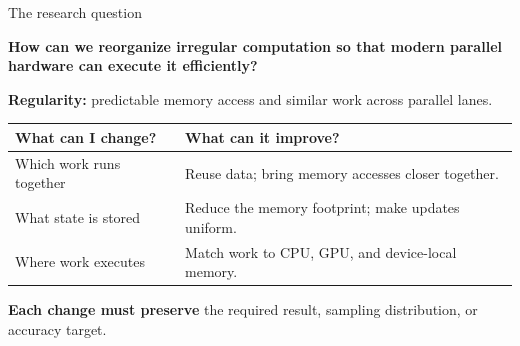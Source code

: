 \documentclass[10pt,aspectratio=169]{beamer}
\begin{document}
\begin{frame}{The research question}
\relax
{\Large\bfseries\color{DeepNavy}
How can we reorganize irregular computation so that modern parallel hardware can execute it efficiently?\par}
\par\vspace{0.3cm}
\textbf{Regularity:} predictable memory access and similar work across parallel lanes.
\par\vspace{0.3cm}
\renewcommand{\arraystretch}{1.3}
\begin{tabular}{@{}>{\raggedright\arraybackslash}p{4.0cm}>{\raggedright\arraybackslash}p{9.1cm}@{}}
\textbf{What can I change?} & \textbf{What can it improve?}\\
\midrule
Which work runs together & Reuse data; bring memory accesses closer together.\\
What state is stored & Reduce the memory footprint; make updates uniform.\\
Where work executes & Match work to CPU, GPU, and device-local memory.
\end{tabular}\par
\par\vspace{0.3cm}
\textbf{Each change must preserve} the required result, sampling distribution, or accuracy target.
\end{frame}

\end{document}
